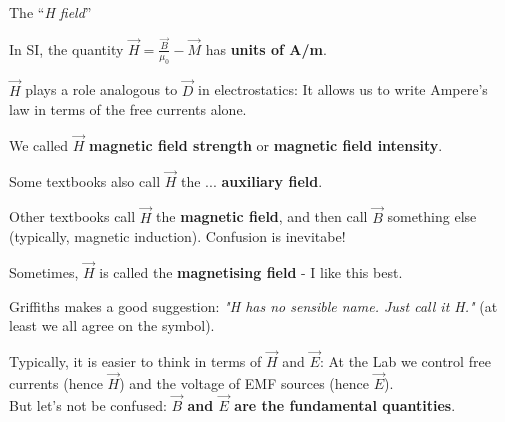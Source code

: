 %
%
%

\begin{frame}{The ``{\em H field}''}

In SI, the quantity $\displaystyle \vec{H} = \frac{\vec{B}}{\mu_0} - \vec{M}$ has {\bf units of A/m}.\\
\vspace{0.1cm}

$\vec{H}$ plays a role analogous to $\vec{D}$ in electrostatics:
It allows us to write Ampere's law in terms of the free currents alone.\\
\vspace{0.1cm}

We called $\vec{H}$ {\bf magnetic field strength} or {\bf magnetic field intensity}.\\
\begin{itemize}
{\small
\item
Some textbooks also call $\vec{H}$ the ... {\bf auxiliary field}.\\
\item
Other textbooks call $\vec{H}$ the {\bf magnetic field}, and then call $\vec{B}$ something else
(typically, magnetic induction). Confusion is inevitabe!\\
\item
Sometimes, $\vec{H}$ is called the {\bf magnetising field} - I like this best.\\
\item
Griffiths makes a good suggestion:
{\em "H has no sensible name. Just call it H."} (at least we all agree on the symbol).\\
}
\end{itemize}

\vspace{0.1cm}

Typically, it is easier to think in terms of  $\vec{H}$ and $\vec{E}$:
At the Lab we control free currents (hence $\vec{H}$) and the voltage of EMF sources (hence $\vec{E}$).\\
But let's not be confused: {\bf $\vec{B}$ and $\vec{E}$ are the fundamental quantities}.

\end{frame}


